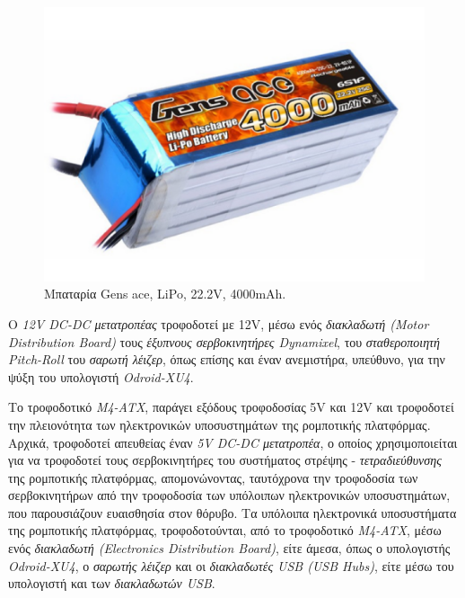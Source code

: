 \begin{figure}[!ht]
	\centering
	\includegraphics[width=0.25\linewidth]{Chapters/Chapter2/Figures/battery.png}
	\caption{Μπαταρία Gens ace, LiPo, 22.2V, 4000mAh.}
	\label{fig:battery}
\end{figure}

\bigskip
Ο \textit{12V DC-DC μετατροπέας} τροφοδοτεί με 12V, μέσω ενός \textit{διακλαδωτή (Motor Distribution Board)} τους \textit{έξυπνους σερβοκινητήρες Dynamixel}, του \textit{σταθεροποιητή Pitch-Roll} του \textit{σαρωτή λέιζερ}, όπως επίσης και έναν ανεμιστήρα, υπεύθυνο, για την ψύξη του υπολογιστή \textit{Odroid-XU4}.

\bigskip
Το τροφοδοτικό \textit{M4-ATX}, παράγει εξόδους τροφοδοσίας 5V και 12V και τροφοδοτεί την πλειονότητα των ηλεκτρονικών υποσυστημάτων της ρομποτικής πλατφόρμας. Αρχικά, τροφοδοτεί απευθείας έναν \textit{5V DC-DC μετατροπέα}, ο οποίος χρησιμοποιείται για να τροφοδοτεί τους σερβοκινητήρες του συστήματος στρέψης - \textit{τετραδιεύθυνσης} της ρομποτικής πλατφόρμας, απομονώνοντας, ταυτόχρονα την τροφοδοσία των σερβοκινητήρων από την τροφοδοσία των υπόλοιπων ηλεκτρονικών υποσυστημάτων, που παρουσιάζουν ευαισθησία στον θόρυβο. Τα υπόλοιπα ηλεκτρονικά υποσυστήματα της ρομποτικής πλατφόρμας, τροφοδοτούνται, από το τροφοδοτικό \textit{M4-ATX}, μέσω ενός \textit{διακλαδωτή (Electronics Distribution Board)}, είτε άμεσα, όπως ο υπολογιστής \textit{Odroid-XU4}, ο \textit{σαρωτής λέιζερ} και οι \textit{διακλαδωτές USB (USB Hubs)}, είτε μέσω του υπολογιστή και των \textit{διακλαδωτών USB}.

